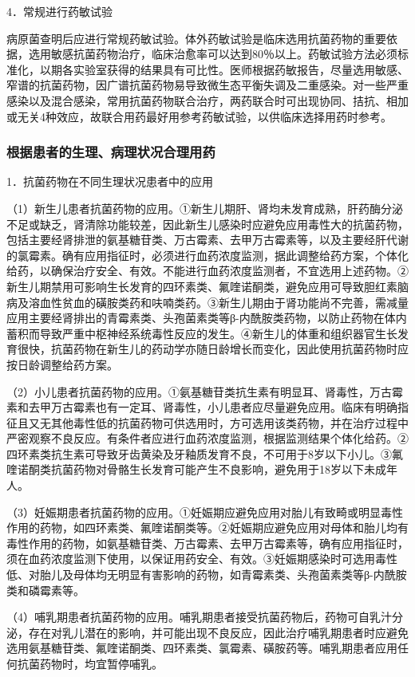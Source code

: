 4．常规进行药敏试验

病原菌查明后应进行常规药敏试验。体外药敏试验是临床选用抗菌药物的重要依据，选用敏感抗菌药物治疗，临床治愈率可以达到80％以上。药敏试验方法必须标准化，以期各实验室获得的结果具有可比性。医师根据药敏报告，尽量选用敏感、窄谱的抗菌药物，因广谱抗菌药物易导致微生态平衡失调及二重感染。对一些严重感染以及混合感染，常用抗菌药物联合治疗，两药联合时可出现协同、拮抗、相加或无关4种效应，故联合用药最好用参考药敏试验，以供临床选择用药时参考。

\subsubsection{根据患者的生理、病理状况合理用药}

1．抗菌药物在不同生理状况患者中的应用

（1）新生儿患者抗菌药物的应用。①新生儿期肝、肾均未发育成熟，肝药酶分泌不足或缺乏，肾清除功能较差，因此新生儿感染时应避免应用毒性大的抗菌药物，包括主要经肾排泄的氨基糖苷类、万古霉素、去甲万古霉素等，以及主要经肝代谢的氯霉素。确有应用指征时，必须进行血药浓度监测，据此调整给药方案，个体化给药，以确保治疗安全、有效。不能进行血药浓度监测者，不宜选用上述药物。②新生儿期禁用可影响生长发育的四环素类、氟喹诺酮类，避免应用可导致胆红素脑病及溶血性贫血的磺胺类药和呋喃类药。③新生儿期由于肾功能尚不完善，需减量应用主要经肾排出的青霉素类、头孢菌素类等β-内酰胺类药物，以防止药物在体内蓄积而导致严重中枢神经系统毒性反应的发生。④新生儿的体重和组织器官生长发育很快，抗菌药物在新生儿的药动学亦随日龄增长而变化，因此使用抗菌药物时应按日龄调整给药方案。

（2）小儿患者抗菌药物的应用。①氨基糖苷类抗生素有明显耳、肾毒性，万古霉素和去甲万古霉素也有一定耳、肾毒性，小儿患者应尽量避免应用。临床有明确指征且又无其他毒性低的抗菌药物可供选用时，方可选用该类药物，并在治疗过程中严密观察不良反应。有条件者应进行血药浓度监测，根据监测结果个体化给药。②四环素类抗生素可导致牙齿黄染及牙釉质发育不良，不可用于8岁以下小儿。③氟喹诺酮类抗菌药物对骨骼生长发育可能产生不良影响，避免用于18岁以下未成年人。

（3）妊娠期患者抗菌药物的应用。①妊娠期应避免应用对胎儿有致畸或明显毒性作用的药物，如四环素类、氟喹诺酮类等。②妊娠期应避免应用对母体和胎儿均有毒性作用的药物，如氨基糖苷类、万古霉素、去甲万古霉素等，确有应用指征时，须在血药浓度监测下使用，以保证用药安全、有效。③妊娠期感染时可选用毒性低、对胎儿及母体均无明显有害影响的药物，如青霉素类、头孢菌素类等β-内酰胺类和磷霉素等。

（4）哺乳期患者抗菌药物的应用。哺乳期患者接受抗菌药物后，药物可自乳汁分泌，存在对乳儿潜在的影响，并可能出现不良反应，因此治疗哺乳期患者时应避免选用氨基糖苷类、氟喹诺酮类、四环素类、氯霉素、磺胺药等。哺乳期患者应用任何抗菌药物时，均宜暂停哺乳。

